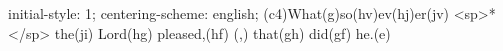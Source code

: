 initial-style: 1;
centering-scheme: english;
(c4)What(g)so(hv)ev(hj)er(jv) <sp>*</sp> the(ji) Lord(hg) pleased,(hf) (,) that(gh) did(gf) he.(e)
